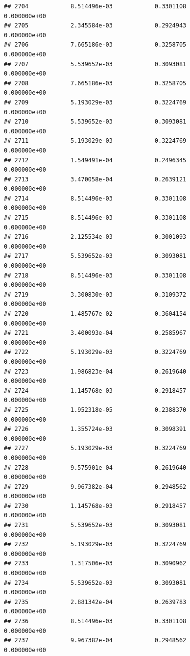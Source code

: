 \documentclass[
]{article}
\begin{document}
\begin{verbatim}
## 2704            8.514496e-03            0.3301108            0.000000e+00
## 2705            2.345584e-03            0.2924943            0.000000e+00
## 2706            7.665186e-03            0.3258705            0.000000e+00
## 2707            5.539652e-03            0.3093081            0.000000e+00
## 2708            7.665186e-03            0.3258705            0.000000e+00
## 2709            5.193029e-03            0.3224769            0.000000e+00
## 2710            5.539652e-03            0.3093081            0.000000e+00
## 2711            5.193029e-03            0.3224769            0.000000e+00
## 2712            1.549491e-04            0.2496345            0.000000e+00
## 2713            3.470058e-04            0.2639121            0.000000e+00
## 2714            8.514496e-03            0.3301108            0.000000e+00
## 2715            8.514496e-03            0.3301108            0.000000e+00
## 2716            2.125534e-03            0.3001093            0.000000e+00
## 2717            5.539652e-03            0.3093081            0.000000e+00
## 2718            8.514496e-03            0.3301108            0.000000e+00
## 2719            3.300830e-03            0.3109372            0.000000e+00
## 2720            1.485767e-02            0.3604154            0.000000e+00
## 2721            3.400093e-04            0.2585967            0.000000e+00
## 2722            5.193029e-03            0.3224769            0.000000e+00
## 2723            1.986823e-04            0.2619640            0.000000e+00
## 2724            1.145768e-03            0.2918457            0.000000e+00
## 2725            1.952318e-05            0.2388370            0.000000e+00
## 2726            1.355724e-03            0.3098391            0.000000e+00
## 2727            5.193029e-03            0.3224769            0.000000e+00
## 2728            9.575901e-04            0.2619640            0.000000e+00
## 2729            9.967382e-04            0.2948562            0.000000e+00
## 2730            1.145768e-03            0.2918457            0.000000e+00
## 2731            5.539652e-03            0.3093081            0.000000e+00
## 2732            5.193029e-03            0.3224769            0.000000e+00
## 2733            1.317506e-03            0.3090962            0.000000e+00
## 2734            5.539652e-03            0.3093081            0.000000e+00
## 2735            2.881342e-04            0.2639783            0.000000e+00
## 2736            8.514496e-03            0.3301108            0.000000e+00
## 2737            9.967382e-04            0.2948562            0.000000e+00

\end{verbatim}
\end{document}

